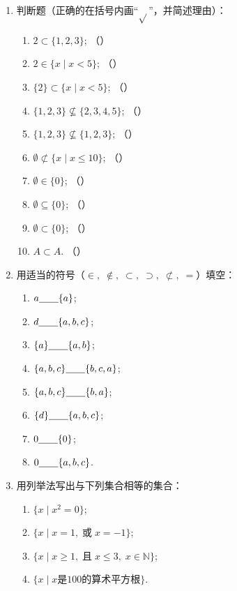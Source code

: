 \begin{enumerate}
    \item 判断题（正确的在括号内画“$\sqrt{}$”，并简述理由）：
\begin{enumerate}[(1)]
    \item $2\subset \{1,2,3\}$; \hfill （\qquad）
    \item $2\in \{x\mid x<5\}$; \hfill （\qquad）
    \item $\{2\}\subset \{x\mid x<5\}$; \hfill （\qquad）
    \item $\{1,2,3\}\not\subseteq \{2,3,4,5\}$; \hfill （\qquad）
    \item $\{1,2,3\}\not\subseteq  \{1,2,3\}$; \hfill （\qquad）
    \item $\emptyset \not\subset \{x\mid x\le 10\}$; \hfill （\qquad）
    \item $\emptyset \in \{0\}$; \hfill （\qquad）    
    \item $\emptyset \subseteq \{0\}$; \hfill （\qquad）
    \item $\emptyset \subset \{0\}$; \hfill （\qquad）
    \item $A \subset A$. \hfill （\qquad）
\end{enumerate}

\item 用适当的符号（$\in,\;\notin,\;\subset,\;\supset,\;\not\subset,\; =$）填空：
\begin{multicols}{2}
\begin{enumerate}[(1)]
    \item $a\underline{\qquad} \{a\}$;
    \item $d\underline{\qquad} \{a,b,c\}$;
    \item $\{a\}\underline{\qquad} \{a,b\}$;
    \item $\{a,b,c\}\underline{\qquad} \{b,c,a\}$;
    \item $\{a,b,c\}\underline{\qquad} \{b,a\}$;
    \item $\{d\}\underline{\qquad} \{a,b,c\}$;
    \item $0\underline{\qquad} \{0\}$;
    \item $0\underline{\qquad} \{a,b,c\}$.
\end{enumerate}
\end{multicols}

\item 用列举法写出与下列集合相等的集合：
\begin{enumerate}[(1)]
    \item $\{x\mid x^2=0\}$;
    \item $\{x\mid x=1,\; \text{或}\; x=-1\}$;
    \item $\{x\mid x\ge 1,\;\text{且}\; x\le 3,\; x\in\mathbb{N}\}$;
    \item $\{x\mid x\text{是100的算术平方根}\}$.
\end{enumerate}


\end{enumerate}

